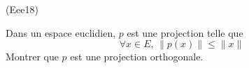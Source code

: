 \begin{tiny}(Eee18)\end{tiny} Dans un espace euclidien, $p$ est une projection telle que
\begin{displaymath}
  \forall x\in E,\, \|p(x) \| \leq \| x \|
\end{displaymath}
Montrer que $p$ est une projection orthogonale.